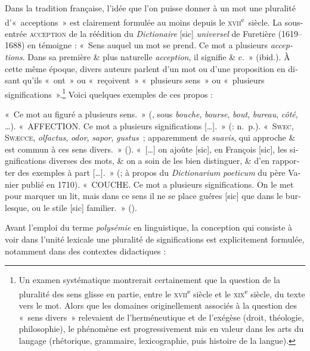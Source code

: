 \documentclass[french,output=paper,colorlinks,citecolor=brown]{../langscibook}
\begin{document}
\begin{otherlanguage}{french}
Dans la tradition française, l’idée que l’on puisse donner à un mot une pluralité d’«~acceptions~» est clairement formulée au moins depuis le \textsc{xvii}\textsuperscript{e}~siècle. La sous-entrée \textsc{acception} de la réédition du \textit{Dictionaire} [sic] \textit{universel} de Furetière (1619--1688) \citep{Furetiere1701} en témoigne : «~Sens auquel un mot se prend. Ce mot a plusieurs \textit{acceptions}. Dans sa première \& plus naturelle \textit{acception}, il signifie \& c.~» (ibid.). À cette même époque, divers auteurs parlent d’un mot ou d’une proposition en disant qu’ils «~ont~» ou «~reçoivent~» «~plusieurs sens~» ou «~plusieurs significations~».\footnote{Un examen systématique montrerait certainement que la question de la pluralité des sens glisse en partie, entre le \textsc{xvii}\textsuperscript{e} siècle et le  \textsc{xix}\textsuperscript{e} siècle, du texte vers le mot. Alors que les domaines originellement associés à la question des «~sens divers~» relevaient de l’herméneutique et de l’exégèse (droit, théologie, philosophie), le phénomène est progressivement mis en valeur dans les arts du langage (rhétorique, grammaire, lexicographie, puis histoire de la langue).} Voici quelques exemples de ces propos :

\ea  «~Ce mot au figuré a plusieurs sens.~» (\citealt{Richelet1680}, sous \textit{bouche}, \textit{bourse}, \textit{bout}, \textit{bureau}, \textit{côté}, …).
\ex «~AFFECTION. Ce mot a plusieurs significations […].~» (\citealt{Régis1691}: n.~p.).
\ex  «~S\textsc{wec,} \textsc{Swæcce,} \textit{olfactus}, \textit{odor}, \textit{sapor}, \textit{gustus~}; apparemment de \textit{suavis}, qui approche \& est commun à ces sens divers.~» (\citealt[930--931]{Thomassin1690}).
\ex «~[…] on ajoûte [sic], en François [sic], les significations diverses des mots, \& on a soin de les bien distinguer, \& d’en rapporter des exemples à part […].~» (\citealt[172]{Leclerc1715}; à propos du \textit{Dictionarium} \textit{poeticum} du père Vanier publié en 1710).
\ex «~COUCHE. Ce mot a plusieurs significations. On le met pour marquer un lit, mais dans ce sens il ne se place guéres [sic] que dans le burlesque, ou le stile [sic] familier.~» (\citealt[167]{Le-Roux1735}).
\z

Avant l’emploi du terme \textit{polysémie} en linguistique, la conception qui consiste à voir dans l’unité lexicale une pluralité de significations est explicitement formulée, notamment dans des contextes didactiques :


\end{otherlanguage}
\end{document}
